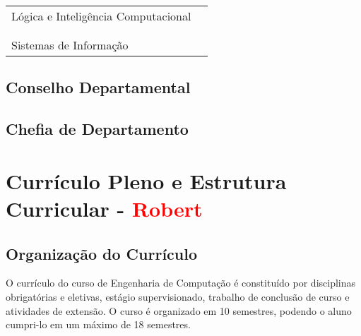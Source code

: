 \begin{table}[ht]
\begin{tabularx}{\textwidth}{ X  l }
		                                                        \hline	
		\multirow{3}{*}{Lógica e Inteligência Computacional}    & \IC               \\ %
		                                                        & \ICII              \\ %
		                                                        & \LogProg          \\ %
																& \MineraDados      \\ %
		                                                        & \ProcImag         \\ %
		                                                        \hline													
		\multirow{4}{*}{Sistemas de Informação}                 & \EngSistC         \\ %
																& \EngSistA		 \\  %
		                                                        & \ProjBD           \\
		                                                        & \EngCompSoc       \\
		                                                        \hline
	\end{tabularx}
\end{table}

\subsection{Conselho Departamental}

\subsection{Chefia de Departamento}

\section{Currículo Pleno e Estrutura Curricular - \textcolor{red}{Robert}}

\subsection{Organização do Currículo}

O currículo do curso de Engenharia de Computação é constituído por disciplinas obrigatórias e eletivas, estágio supervisionado, trabalho de conclusão de curso e atividades de extensão. O curso é organizado em 10 semestres, podendo o aluno cumpri-lo em um máximo de 18 semestres.

